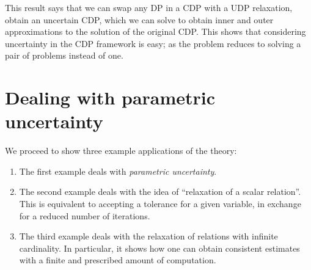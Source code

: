 

This result says that we can swap any DP in a CDP with a UDP relaxation, obtain an uncertain CDP, which we can solve to obtain inner and outer approximations to the solution of the original CDP.
This shows that considering uncertainty in the CDP framework is easy; as the problem reduces to solving a pair of problems instead of one.

\section[Parametric uncertainty]{Dealing with parametric uncertainty}
\label{sec:Applications}

We proceed to show three example applications of the theory:
\begin{enumerate}
    \item The first example deals with \emph{parametric uncertainty}.
    \item The second example deals with the idea of ``relaxation of a scalar relation''.
          This is equivalent to accepting a tolerance for a given variable, in exchange for a reduced number of iterations.
    \item The third example deals with the relaxation of relations with infinite cardinality.
          In particular, it shows how one can obtain consistent estimates with a finite and prescribed amount of computation.
\end{enumerate}

